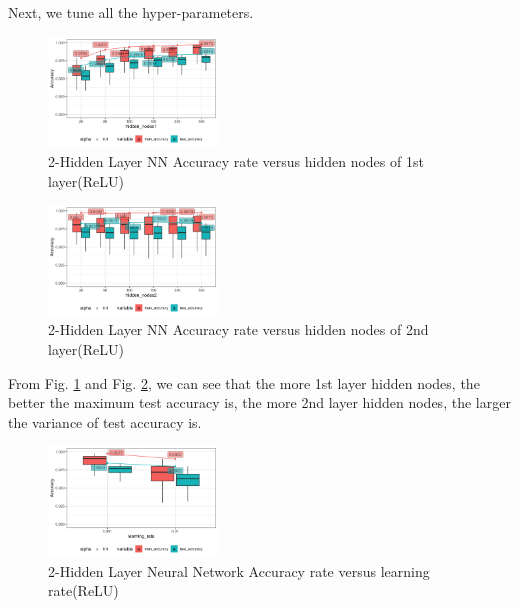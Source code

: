 \documentclass[conference]{IEEEtran}
\begin{document}
Next, we tune all the hyper-parameters.
\begin{figure}[htbp]
\centerline{\includegraphics[width=0.4\textwidth]{figure/2-Hidden Layer Neural Network Accuracy rate versus hidden_nodes1.png}}
\caption{2-Hidden Layer NN Accuracy rate versus hidden nodes of 1st layer(ReLU)}
\label{2-Hidden Layer Neural Network Accuracy rate versus hidden nodes of 1st layer(ReLU)}
\end{figure}
\begin{figure}[htbp]
\centerline{\includegraphics[width=0.4\textwidth]{figure/2-Hidden Layer Neural Network Accuracy rate versus hidden_nodes2.png}}
\caption{2-Hidden Layer NN Accuracy rate versus hidden nodes of 2nd layer(ReLU)}
\label{2-Hidden Layer Neural Network Accuracy rate versus hidden nodes of 2nd layer(ReLU)}
\end{figure}
From Fig. \ref{2-Hidden Layer Neural Network Accuracy rate versus hidden nodes of 1st layer(ReLU)} and Fig. \ref{2-Hidden Layer Neural Network Accuracy rate versus hidden nodes of 2nd layer(ReLU)}, we can see that the more 1st layer hidden nodes, the better the maximum test accuracy is, the more 2nd layer hidden nodes, the larger the variance of test accuracy is.
\begin{figure}[htbp]
\centerline{\includegraphics[width=0.4\textwidth]{figure/2-Hidden Layer Neural Network Accuracy rate versus learning_rate.png}}
\caption{2-Hidden Layer Neural Network Accuracy rate versus learning rate(ReLU)}
\label{2-Hidden Layer Neural Network Accuracy rate versus learning rate(ReLU)}
\end{figure}
\end{document}
